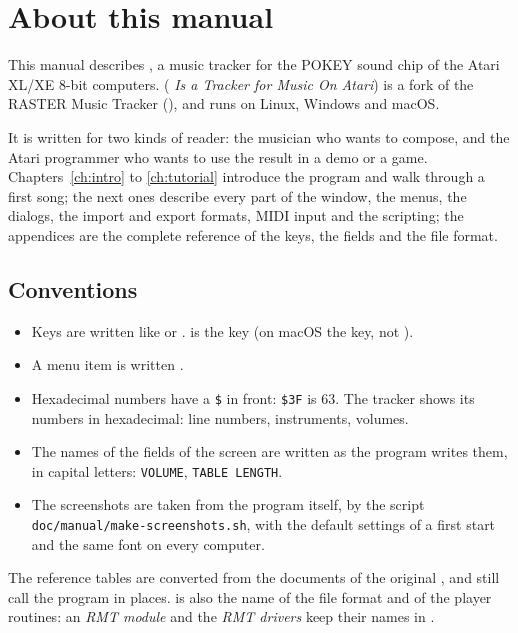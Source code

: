 \chapter*{About this manual}

This manual describes \RITMO{}, a music tracker for the POKEY sound chip of the Atari XL/XE
8-bit computers. \RITMO{} (\emph{\RITMO{} Is a Tracker for Music On Atari}) is a fork of the
RASTER Music Tracker (\RMT{}), and runs on Linux, Windows and macOS.

It is written for two kinds of reader: the musician who wants to compose, and the Atari
programmer who wants to use the result in a demo or a game. Chapters~\ref{ch:intro} to
\ref{ch:tutorial} introduce the program and walk through a first song; the next ones describe
every part of the window, the menus, the dialogs, the import and export formats, MIDI input
and the scripting; the appendices are the complete reference of the keys, the fields and the
file format.

\section*{Conventions}

\begin{itemize}
  \item Keys are written like  or .  is the  key
        (on macOS the  key, not ).
  \item A menu item is written .
  \item Hexadecimal numbers have a \texttt{\$} in front: \texttt{\$3F} is 63. The tracker shows
        its numbers in hexadecimal: line numbers, instruments, volumes.
  \item The names of the fields of the screen are written as the program writes them, in capital
        letters: \texttt{VOLUME}, \texttt{TABLE LENGTH}.
  \item The screenshots are taken from the program itself, by the script
        \texttt{doc/\allowbreak manual/\allowbreak make-\allowbreak screenshots.sh}, with the default settings of a first start
        and the same font on every computer.
\end{itemize}

\begin{note}
The reference tables are converted from the documents of the original \RMT{}, and still call the program \RMT{} in places. \RMT{} is also the name of
the file format and of the player routines: an \emph{RMT module} and the \emph{RMT drivers} keep their names in \RITMO{}.
\end{note}

